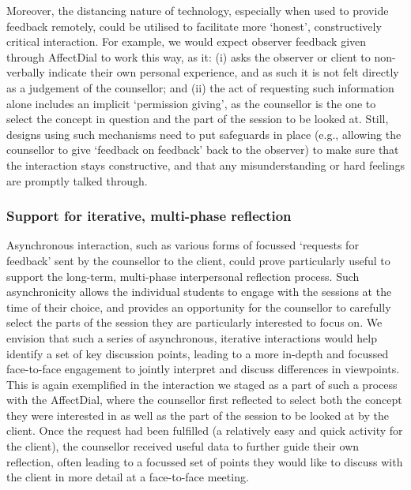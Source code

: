 \documentclass{sigchi}
\begin{document}
Moreover, the distancing nature of technology, especially when used to provide feedback remotely, could be utilised to facilitate more `honest', constructively critical interaction. For example, we would expect observer feedback given through AffectDial to work this way, as it: (i) asks the observer or client to non-verbally indicate their own personal experience, and as such it is not felt directly as a judgement of the counsellor; and (ii) the act of requesting such information alone includes an implicit `permission giving', as the counsellor is the one to select the concept in question and the part of the session to be looked at. Still, designs using such mechanisms need to put safeguards in place (e.g., allowing the counsellor to give `feedback on feedback' back to the observer) to make sure that the interaction stays constructive, and that any misunderstanding or hard feelings are promptly talked through. 

\subsubsection{Support for iterative, multi-phase reflection}
Asynchronous interaction, such as various forms of focussed `requests for feedback' sent by the counsellor to the client, could prove particularly useful to support the long-term, multi-phase interpersonal reflection process. Such asynchronicity allows the individual students to engage with the sessions at the time of their choice, and provides an opportunity for the counsellor to carefully select the parts of the session they are particularly interested to focus on. We envision that such a series of asynchronous, iterative interactions would help identify a set of key discussion points, leading to a more in-depth and focussed face-to-face engagement to jointly interpret and discuss differences in viewpoints. This is again exemplified in the interaction we staged as a part of such a process with the AffectDial, where the counsellor first reflected to select both the concept they were interested in as well as the part of the session to be looked at by the client. Once the request had been fulfilled (a relatively easy and quick activity for the client), the counsellor received useful data to further guide their own reflection, often leading to a focussed set of points they would like to discuss with the client in more detail at a face-to-face meeting.

\end{document}
